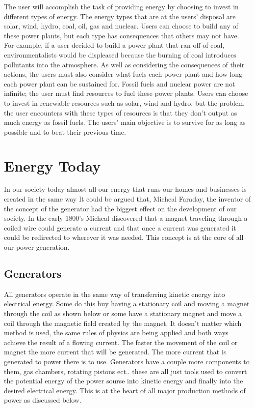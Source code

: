\documentclass[msc,oneside]{ubcthesis}%
\begin{document}
The user will accomplish the task of providing energy by choosing to invest in different types of energy. 
The energy types that are at the users' disposal are solar, wind, hydro, coal, oil, gas and nuclear. Users 
can choose to build any of these power plants, but each type has consequences that others may not have. For 
example, if a user decided to build a power plant that ran off of coal, environmentalists would be 
displeased because the burning of coal introduces pollutants into the atmosphere. As well as considering 
the consequences of their actions, the users must also consider what fuels each power plant and how long 
each power plant can be sustained for. Fossil fuels and nuclear power are not infinite; the user must find 
resources to fuel these power plants. Users can choose to invest in renewable resources such as solar, wind 
and hydro, but the problem the user encounters with these types of resources is that they don't output as 
much energy as fossil fuels. The users' main objective is to survive for as long as possible and to beat 
their previous time. 

\chapter{Energy Today}
  In our society today almost all our energy that runs our homes and businesses is created in the same way 
It could be argued that, Micheal Faraday, the inventor of the concept of the generator had the biggest 
effect on the development of our society. In the early 1800's Micheal discovered that a magnet traveling 
through a coiled wire could generate a current and that once a current was generated it could be redirected 
to wherever it was needed. This concept is at the core of all our power generation.

\section{Generators}
  
  All generators operate in the same way of transferring kinetic energy into electrical energy. Some do 
  this buy having a stationary coil and moving a magnet through the coil as shown below or some have a 
  stationary magnet and move a coil through the magnetic field created by the magnet. It doesn't matter 
  which method is used, the same rules of physics are being applied and both ways achieve the result of a 
  flowing current. The faster the movement of the coil or magnet the more current that will be generated. 
  The more current that is generated to power there is to use. Generators have a couple more components to 
  them, gas chambers, rotating pistons ect.. these are all just tools used to convert the potential energy 
  of the power sourse into kinetic energy and finally into the desired electrical energy. This is at the 
  heart of all major production methods of power 
  as discussed below. 
\end{document}
